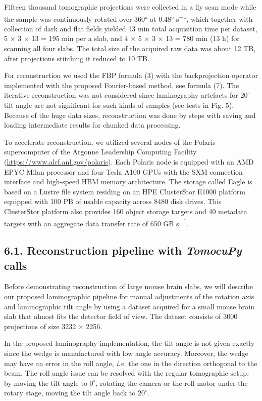 \documentclass{article}
\begin{document}
Fifteen thousand tomographic projections were collected in a fly scan mode while the sample was continuously rotated over 360° at 0.48° s\textsuperscript{−1}, which together with collection of dark and flat fields yielded 13 min total acquisition time per dataset, 5 × 3 × 13 = 195 min per a slab, and 4 × 5 × 3 × 13 = 780 min (13 h) for scanning all four slabs. The total size of the acquired raw data was about 12 TB, after projections stitching it reduced to 10 TB.

For reconstruction we used the FBP formula (3) with the backprojection operator implemented with the proposed Fourier-based method, see formula (7). The iterative reconstruction was not considered since laminography artefacts for $20^\circ$ tilt angle are not significant for such kinds of samples (see tests in Fig. 5). Because of the huge data sizes, reconstruction was done by steps with saving and loading intermediate results for chunked data processing.

To accelerate reconstruction, we utilized several nodes of the Polaris supercomputer of the Argonne Leadership Computing Facility (\url{https://www.alcf.anl.gov/polaris}). Each Polaris node is equipped with an AMD EPYC Milan processor and four Tesla A100 GPUs with the SXM connection interface and high-speed HBM memory architecture. The storage called Eagle is based on a Lustre file system residing on an HPE ClusterStor E1000 platform equipped with 100 PB of usable capacity across 8480 disk drives. This ClusterStor platform also provides 160 object storage targets and 40 metadata targets with an aggregate data transfer rate of 650 GB s\textsuperscript{−1}.

\subsection*{6.1. Reconstruction pipeline with \emph{TomocuPy} calls}

Before demonstrating reconstruction of large mouse brain slabs, we will describe our proposed laminographic pipeline for manual adjustments of the rotation axis and laminographic tilt angle by using a dataset acquired for a small mouse brain slab that almost fits the detector field of view. The dataset consists of 3000 projections of size 3232 × 2256.

In the proposed laminography implementation, the tilt angle is not given exactly since the wedge is manufactured with low angle accuracy. Moreover, the wedge may have an error in the roll angle, \emph{i.e.} the one in the direction orthogonal to the beam. The roll angle issue can be resolved with the regular tomographic setup: by moving the tilt angle to $0^\circ$, rotating the camera or the roll motor under the rotary stage, moving the tilt angle back to $20^\circ$.
\end{document}
